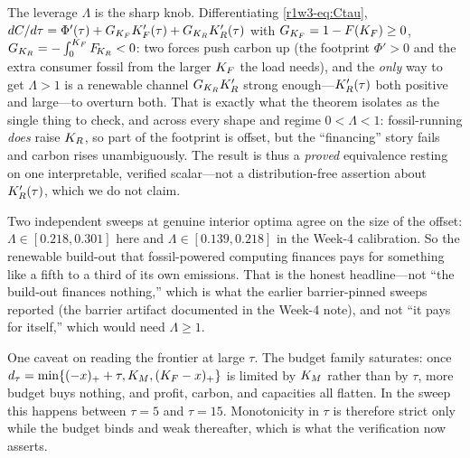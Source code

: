 \begin{remark}
The leverage $\Lambda$ is the sharp knob. Differentiating \eqref{r1w3-eq:Ctau},
$dC/d\tau=\Phi'(\tau)+G_{K_F}K_F'(\tau)+G_{K_R}K_R'(\tau)$ with
$G_{K_F}=1-F(K_F)\ge0$, $G_{K_R}=-\int_0^{K_F}F_{\!K_R}<0$: two forces push carbon up
(the footprint $\Phi'>0$ and the extra consumer fossil from the larger $K_F$ the load
needs), and the \emph{only} way to get $\Lambda>1$ is a renewable channel $G_{K_R}K_R'$
strong enough---$K_R'(\tau)$ both positive and large---to overturn both. That is exactly
what the theorem isolates as the single thing to check, and across every shape and regime
$0<\Lambda<1$: fossil-running \emph{does} raise $K_R$, so part of the footprint is offset, but
the ``financing'' story fails and carbon rises unambiguously. The result is thus a
\emph{proved} equivalence resting on one interpretable, verified scalar---not a
distribution-free assertion about $K_R'(\tau)$, which we do not claim.

Two independent sweeps at genuine interior optima agree on the size of the offset:
$\Lambda\in[0.218,0.301]$ here and $\Lambda\in[0.139,0.218]$ in the Week-4 calibration. So
the renewable build-out that fossil-powered computing finances pays for something like a
fifth to a third of its own emissions. That is the honest headline---not ``the build-out
finances nothing,'' which is what the earlier barrier-pinned sweeps reported (the barrier artifact documented in the
Week-4 note), and not ``it pays for itself,'' which would
need $\Lambda\ge1$.

One caveat on reading the frontier at large $\tau$. The budget family saturates: once
$d_\tau=\min\{(-x)_++\tau,K_M,(K_F-x)_+\}$ is limited by $K_M$ rather than by $\tau$, more
budget buys nothing, and profit, carbon, and capacities all flatten. In the sweep this
happens between $\tau=5$ and $\tau=15$. Monotonicity in $\tau$ is therefore strict only
while the budget binds and weak thereafter, which is what the verification now asserts.

\end{remark}

